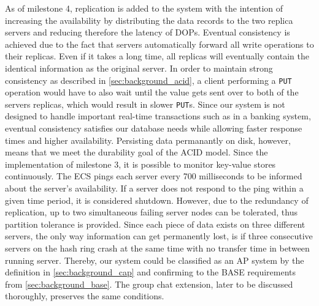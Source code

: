 As of milestone 4, replication is added to the system with the intention of increasing the availability by distributing the data records to the two replica servers and reducing therefore the latency of DOPs. Eventual consistency is achieved due to the fact that servers automatically forward all write operations to their replicas. Even if it takes a long time, all replicas will eventually contain the identical information as the original server. In order to maintain strong consistency as described in \ref{sec:background_acid}, a client performing a \texttt{PUT} operation would have to also wait until the value gets sent over to both of the servers replicas, which would result in slower \texttt{PUT}s. Since our system is not designed to handle important real-time transactions such as in a banking system, eventual consistency satisfies our database needs while allowing faster response times and higher availability. Persisting data permanantly on disk, however, means that we meet the durability goal of the ACID model.
Since the implementation of milestone 3, it is possible to monitor key-value stores continuously. The ECS pings each server every 700 milliseconds to be informed about the server's availability. If a server does not respond to the ping within a given time period, it is considered shutdown. However, due to the redundancy of replication,
up to two simultaneous failing server nodes can be tolerated, thus partition tolerance is provided. Since each piece of data exists on three different servers, the only way information can get permanently lost, is if three consecutive servers on the hash ring crash at the same time with no transfer time in between running server.
Thereby, our system could be classified as an AP system by the definition in \ref{sec:background_cap} and confirming to the BASE requirements from \ref{sec:background_base}.
The group chat extension, later to be discussed thoroughly, preserves the same conditions.

